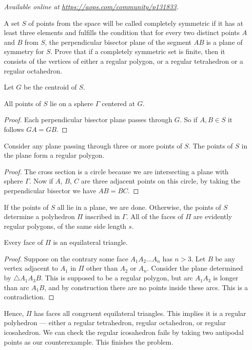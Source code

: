 \textsl{Available online at \url{https://aops.com/community/p131833}.}
\begin{mdframed}[style=mdpurplebox,frametitle={Problem statement}]
A set $S$ of points from the space will be called
completely symmetric if it has at least three elements
and fulfills the condition that for every two distinct points
$A$ and $B$ from $S$,
the perpendicular bisector plane of the segment $AB$
is a plane of symmetry for $S$.
Prove that if a completely symmetric set is finite,
then it consists of the vertices of either a regular polygon,
or a regular tetrahedron or a regular octahedron.
\end{mdframed}
Let $G$ be the centroid of $S$.

\begin{claim*}
  All points of $S$ lie on a sphere $\Gamma$ centered at $G$.
\end{claim*}
\begin{proof}
  Each perpendicular bisector plane passes through $G$.
  So if $A,B \in S$ it follows $GA = GB$.
\end{proof}

\begin{claim*}
  Consider any plane passing through three or more points of $S$.
  The points of $S$ in the plane form a regular polygon.
\end{claim*}
\begin{proof}
  The cross section is a circle because we are intersecting
  a plane with sphere $\Gamma$.
  Now if $A$, $B$, $C$ are three adjacent points on this circle,
  by taking the perpendicular bisector we have $AB=BC$.
\end{proof}

If the points of $S$ all lie in a plane, we are done.
Otherwise, the points of $S$ determine a polyhedron
$\Pi$ inscribed in $\Gamma$.
All of the faces of $\Pi$ are evidently regular polygons,
of the same side length $s$.

\begin{claim*}
  Every face of $\Pi$ is an equilateral triangle.
\end{claim*}
\begin{proof}
  Suppose on the contrary some face $A_1 A_2 \dots A_n$
  has $n > 3$.
  Let $B$ be any vertex adjacent to $A_1$ in $\Pi$
  other than $A_2$ or $A_n$.
  Consider the plane determined by $\triangle A_1 A_3 B$.
  This is supposed to be a regular polygon,
  but arc $A_1 A_3$ is longer than arc $A_1 B$,
  and by construction there are no points inside these arcs.
  This is a contradiction.
\end{proof}

Hence, $\Pi$ has faces all congruent equilateral triangles.
This implies it is a regular polyhedron --- either
a regular tetrahedron, regular octahedron,
or regular icosahedron.
We can check the regular icosahedron fails by
taking two antipodal points as our counterexample.
This finishes the problem.
\pagebreak